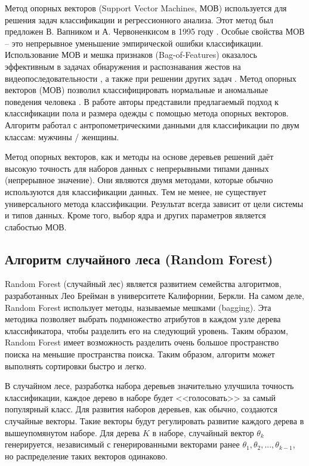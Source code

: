 Метод опорных векторов (Support Vector Machines, МОВ)  используется для решения задач классификации и регрессионного анализа. Этот метод был предложен В. Вапником и А. Червоненкисом в 1995 году \cite{Vapnik1995}. Особые свойства МОВ – это непрерывное уменьшение эмпирической ошибки классификации. Использование МОВ и мешка признаков (Bag-of-Features) оказалось эффективным в задачах обнаружения и распознавания жестов на видеопоследовательности \cite{Nasser2011, Dardas2010}, а также при решении других задач \cite{Jiang2007, Lazebnik2006}. Метод опорных векторов (МОВ) позволил классифицировать нормальные и аномальные поведения человека \cite{Yogameena2010}. В работе \cite{Nguyen2015} авторы представили предлагаемый подход к классификации пола и размера одежды с помощью метода опорных векторов. Алгоритм работал с антропометрическими данными для классификации по двум классам: мужчины / женщины.

Метод опорных векторов, как и методы на основе деревьев решений даёт высокую точность для наборов данных с непрерывными типами данных (непрерывное значение). Они являются двумя методами, которые обычно используются для классификации данных. Тем не менее, не существует универсального метода классификации. Результат всегда зависит от цели системы и типов данных. Кроме того, выбор ядра и других параметров является слабостью МОВ.

\subsection{Алгоритм случайного леса (Random Forest)}

Random Forest (случайный лес) \cite{Breiman2002, Breiman2001} является развитием семейства алгоритмов, разработанных Лео Брейман в университете Калифорнии, Беркли. На самом деле, Random Forest использует методы, называемые мешками (bagging). Эта методика позволяет выбрать подмножество атрибутов в каждом узле дерева классификатора, чтобы разделить его на следующий уровень. Таким образом, Random Forest имеет возможность разделить очень большое пространство поиска на меньшие пространства поиска. Таким образом, алгоритм может выполнять сортировки быстро и легко.

В случайном лесе, разработка набора деревьев значительно улучшила точность классификации, каждое дерево в наборе будет <<голосовать>> за самый популярный класс. Для развития наборов деревьев, как обычно, создаются случайные векторы. Такие векторы будут регулировать развитие каждого дерева в вышеупомянутом наборе. Для дерева $K$ в наборе, случайный вектор $\theta_k$  генерируется, независимый с генерированными векторами ранее $\theta_1, \theta_2, ..., \theta_{k-1}$, но распределение таких векторов одинаково. 

